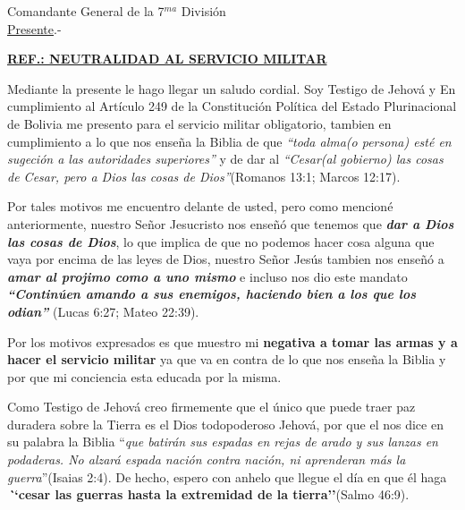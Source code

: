 \documentclass[a4paper,10pt]{letter}
\begin{document}
\date{1 de diciembre de 2010}

\begin{letter}{Comandante General de la 7$^{ma}$ Divisi\'on \\ \underline{Presente}.-}
\begin{center}
\opening{\underline{{\bfseries REF.:  NEUTRALIDAD AL SERVICIO MILITAR}}} 
\end{center}

Mediante la presente le hago llegar un saludo cordial. Soy Testigo de Jehov\'a y En cumplimiento al Art\'iculo 249 
de la Constituci\'on Pol\'itica del Estado Plurinacional de Bolivia me presento para el servicio militar obligatorio, 
tambien en cumplimiento a lo que nos ense\~na la Biblia de que \textit{``toda alma(o persona) est\'e en sugeci\'on a las 
autoridades superiores''} y de dar al \textit{``Cesar(al gobierno) las cosas de Cesar, pero a Dios las cosas de 
Dios''}(Romanos 13:1; Marcos 12:17).

Por tales motivos me encuentro delante de usted, pero como mencion\'e anteriormente, nuestro Se\~nor Jesucristo nos 
ense\~n\'o que tenemos que {\bfseries \textit {dar a Dios las cosas de Dios}}, lo que implica de que no podemos hacer 
cosa alguna que vaya por encima de las leyes de Dios, nuestro Se\~nor Jes\'us tambien nos ense\~n\'o a {\bfseries 
\textit{amar al projimo como a uno mismo}} e incluso nos dio este mandato {\bfseries \textit {``Contin\'uen amando a sus 
enemigos, haciendo bien a los que los odian''}} (Lucas 6:27; Mateo 22:39).

Por los motivos expresados es que muestro mi \textbf{negativa a tomar las armas y a hacer el servicio militar} ya que va 
en contra de lo que nos ense\~na la Biblia y por que mi conciencia esta educada por la misma.

Como Testigo de Jehov\'a creo firmemente que el \'unico que puede traer paz duradera sobre la Tierra es el Dios 
todopoderoso Jehov\'a, por que el nos dice en su palabra la Biblia ``\textit {que batir\'an sus espadas en rejas de arado y sus lanzas en podaderas. No alzar\'a espada naci\'on contra naci\'on, ni aprenderan m\'as la guerra}''(Isaias 2:4). De hecho, espero con anhelo que llegue el d\'ia en que \'el haga {\bfseries {\textit``cesar las 
guerras hasta la extremidad de la tierra''}}(Salmo 46:9).


\end{letter}
\end{document}
